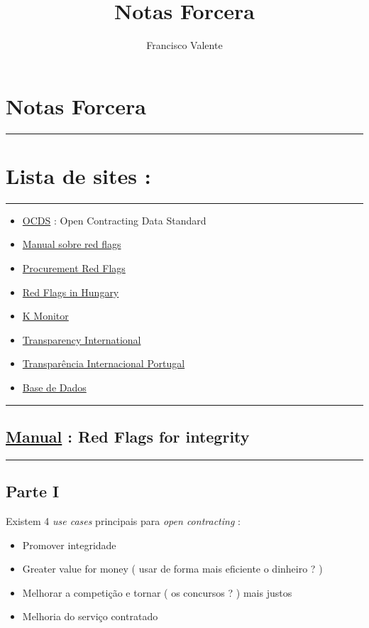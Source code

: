\documentclass{book}
\title{Notas Forcera}
\author{Francisco Valente}
\begin{document}
\section*{Notas Forcera}

\hrule
\vspace{0.5cm}
\section*{Lista de sites :}
\hrule
\vspace{0.5cm}

\begin{itemize}
		\item \href{https://www.open-contracting.org/}{OCDS} : Open Contracting Data Standard 
		\item \href{https://www.open-contracting.org/wp-content/uploads/2016/11/OCP2016-Red-flags-for-integrityshared-1.pdf}{Manual sobre red flags}		
		\item \href{https://redflags.ai/}{Procurement Red Flags} 		
		\item \href{https://www.redflags.eu/}{Red Flags in Hungary}  		
		\item \href{https://k-monitor.hu/home}{K Monitor}             		
		\item \href{https://www.transparency.org/}{Transparency International}	
		\item \href{https://transparencia.pt/}{Transparência Internacional Portugal}
		\item \href{https://www.base.gov.pt/base4}{Base de Dados}				
\end{itemize}

\vspace{1cm}
\hrule
\subsection*{\href{https://www.open-contracting.org/}{Manual} : Red Flags for integrity}
\hrule
\vspace{1cm}

\subsection*{Parte I}

  
Existem 4 \textit{use cases} principais para \textit{open contracting} :

\begin{itemize}
  \item  Promover integridade
  \item  Greater value for money ( usar de forma mais eficiente o dinheiro ? )
  \item  Melhorar a competição e tornar ( os concursos  ? ) mais justos 
  \item  Melhoria do serviço contratado
\end{itemize}
\end{document}
